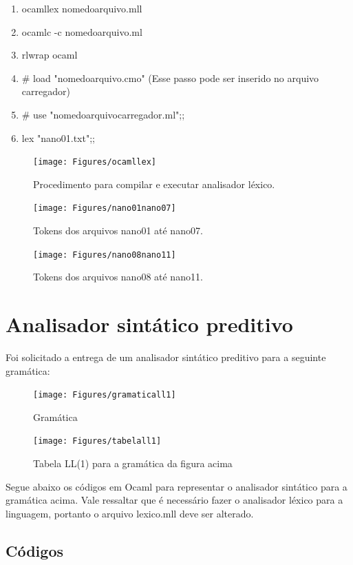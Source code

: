 \documentclass[hidelinks,12pt]{article}
\begin{document}
	\begin{enumerate}
	\item ocamllex nomedoarquivo.mll
	\item ocamlc -c nomedoarquivo.ml
	\item rlwrap ocaml
	\item \# load "nomedoarquivo.cmo" (Esse passo pode ser inserido no arquivo carregador)
	\item \# use "nomedoarquivocarregador.ml";;
	\item lex "nano01.txt";;
	\end{enumerate}

	\begin{figure}[h!]
		\centering
		\texttt{[image: Figures/ocamllex]}
		\caption{Procedimento para compilar e executar analisador léxico.}
	\end{figure}
	
	\newpage
	\begin{figure}[h!]
		\centering
		\texttt{[image: Figures/nano01nano07]}
		\caption{Tokens dos arquivos nano01 até nano07.}
	\end{figure}
	
	\newpage
	\begin{figure}[h!]
		\centering
		\texttt{[image: Figures/nano08nano11]}
		\caption{Tokens dos arquivos nano08 até nano11.}
	\end{figure}
	
	\newpage
	\section{Analisador sintático preditivo}
	
	Foi solicitado a entrega de um analisador sintático preditivo para a seguinte gramática:
	
	\begin{figure}[h!]
		\centering
		\texttt{[image: Figures/gramaticall1]}
		\caption{Gramática}
	\end{figure}
	
	\begin{figure}[h!]
		\centering
		\texttt{[image: Figures/tabelall1]}
		\caption{Tabela LL(1) para a gramática da figura acima}
	\end{figure}
	
	Segue abaixo os códigos em Ocaml para representar o analisador sintático para a gramática acima. Vale ressaltar que é necessário fazer o analisador léxico para a linguagem, portanto o arquivo lexico.mll deve ser alterado.
	\subsection{Códigos}	
	
\end{document}

